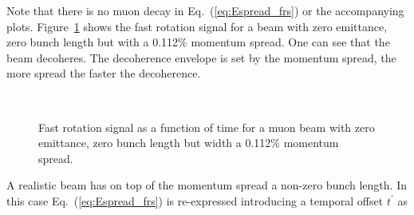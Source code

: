 Note that there is no muon decay in Eq.~(\ref{eq:Espread_frs}) or the accompanying plots.
Figure~\ref{fig:Espread_frs} shows the fast rotation signal for a beam with zero emittance, zero bunch length but with a 0.112\% momentum spread. 
One can see that the beam decoheres. The decoherence envelope is set by the momentum spread, the more spread the faster the decoherence.

\begin{figure}[bt]
\centering
{}\\
\caption{Fast rotation signal as a function of time for a muon beam with zero emittance, zero bunch length but width a 0.112\% momentum spread.}
\label{fig:Espread_frs}
\end{figure}

A realistic beam has on top of the momentum spread a non-zero bunch length. 
In this case Eq.~(\ref{eq:Espread_frs}) is re-expressed introducing a temporal offset $t^\prime$ as

